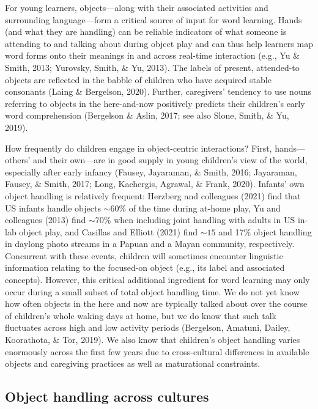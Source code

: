 \documentclass[10pt, letterpaper]{article}
\begin{document}
For young learners, objects---along with their associated activities and
surrounding language---form a critical source of input for word
learning. Hands (and what they are handling) can be reliable indicators
of what someone is attending to and talking about during object play and
can thus help learners map word forms onto their meanings in and across
real-time interaction (e.g., Yu \& Smith, 2013; Yurovsky, Smith, \& Yu,
2013). The labels of present, attended-to objects are reflected in the
babble of children who have acquired stable consonants (Laing \&
Bergelson, 2020). Further, caregivers' tendency to use nouns referring
to objects in the here-and-now positively predicts their children's
early word comprehension (Bergelson \& Aslin, 2017; see also Slone,
Smith, \& Yu, 2019).

How frequently do children engage in object-centric interactions? First,
hands---others' and their own---are in good supply in young children's
view of the world, especially after early infancy (Fausey, Jayaraman, \&
Smith, 2016; Jayaraman, Fausey, \& Smith, 2017; Long, Kachergis,
Agrawal, \& Frank, 2020). Infants' own object handling is relatively
frequent: Herzberg and colleagues (2021) find that US infants handle
objects \({\sim}60\%\) of the time during at-home play, Yu and
colleagues (2013) find \({\sim}70\%\) when including joint handling with
adults in US in-lab object play, and Casillas and Elliott (2021) find
\({\sim}15\) and 17\% object handling in daylong photo streams in a
Papuan and a Mayan community, respectively. Concurrent with these
events, children will sometimes encounter linguistic information
relating to the focused-on object (e.g., its label and associated
concepts). However, this critical additional ingredient for word
learning may only occur during a small subset of total object handling
time. We do not yet know how often objects in the here and now are
typically talked about over the course of children's whole waking days
at home, but we do know that such talk fluctuates across high and low
activity periods (Bergelson, Amatuni, Dailey, Koorathota, \& Tor, 2019).
We also know that children's object handling varies enormously across
the first few years due to cross-cultural differences in available
objects and caregiving practices as well as maturational constraints.

\hypertarget{object-handling-across-cultures}{%
\subsection{Object handling across
cultures}\label{object-handling-across-cultures}}
\end{document}
